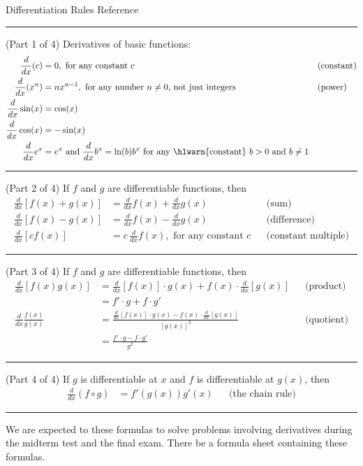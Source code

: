 \documentclass[../main.tex]{subfiles}
\begin{document}
\begin{lesson}{Differentiation Rules Reference}

  \hrule
  (Part 1 of 4) Derivatives of basic functions: 
  \begin{align*}
    \frac{d}{dx} (c)
    &= 0, \text{ for any constant \(c\)}
    && \text{(constant)} \\
    \frac{d}{dx} (x^{n})
    &= n x^{n-1}, \text{ for any number \(n \ne 0\), not just integers} 
    && \text{(power)} \\
    \frac{d}{dx} \sin(x)
    &= \cos(x) \\
    \frac{d}{dx} \cos(x)
    &= -\sin(x) \\
    \frac{d}{dx} e^{x} &= e^{x} \text{ and } \frac{d}{dx}b^{x} = \ln(b)b^{x} \text{ for any \hlwarn{constant} } b > 0 \text{ and } b \ne 1
  \end{align*}

  \hrule

  (Part 2 of 4) If \(f\) and \(g\) are differentiable functions, then
  \begin{align*}
    \frac{d}{dx} [f(x) + g(x)] 
    &= \frac{d}{dx}f(x) + \frac{d}{dx}g(x)
    && \text{(sum)} \\[1em]
    \frac{d}{dx} [f(x) - g(x)] 
    &= \frac{d}{dx}f(x) - \frac{d}{dx}g(x)
    && \text{(difference)} \\[1em]
    \frac{d}{dx} [c f(x)] 
    &= c \, \frac{d}{dx} f(x), \text{ for any constant \(c\)}
    && \text{(constant multiple)}
  \end{align*}

  \hrule

  (Part 3 of 4) If \(f\) and \(g\) are differentiable functions, then
  \begin{align*}
    \frac{d}{dx} [f(x)g(x)] 
    &= { \frac{d}{dx} [f(x)] \cdot g(x)+ f(x) \cdot \frac{d}{dx}[g(x)]}
    && \text{(product)} \\
    &= f' \cdot g + f \cdot g' \\[1em]
    \frac{d}{dx} \frac{f(x)}{g(x)}
    &= {\frac{\frac{d}{dx} [f(x)] \cdot g(x) - f(x) \cdot \frac{d}{dx}[g(x)] }{ [g(x)]^{2} }}
    && \text{(quotient)} \\
    &= \frac{f' \cdot g - f \cdot g'}{g^{2}}
  \end{align*}

  \hrule

  (Part 4 of 4) If \(g\) is differentiable at \(x\) and \(f\) is differentiable at \(g(x)\), then 
  \begin{align*}
    \frac{d}{dx} (f \circ g)
    &= f'(g(x)) g'(x)
    &&\text{(the chain rule)}
  \end{align*}

  \hrule

  \faExclamationTriangle{} We are expected to  these formulas to solve problems involving derivatives during the midterm test and the final exam. There  be a formula sheet containing these formulas.
\end{lesson}
\end{document}
